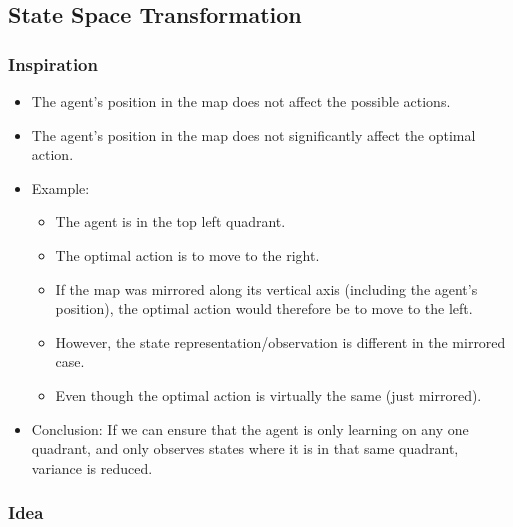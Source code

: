\documentclass{article} %
\begin{document}
	\subsection{State Space Transformation}
	\subsubsection{Inspiration}
	\begin{itemize}
		\item The agent's position in the map does not affect the possible actions.
		\item The agent's position in the map does not significantly affect the optimal action.
		\item Example:
		\begin{itemize}
			\item The agent is in the top left quadrant.
			\item The optimal action is to move to the right.
			\item If the map was mirrored along its vertical axis (including the agent's position), the optimal action would therefore be to move to the left.
			\item However, the state representation/observation is different in the mirrored case.
			\item Even though the optimal action is virtually the same (just mirrored).
		\end{itemize}
		\item Conclusion: If we can ensure that the agent is only learning on any one quadrant, and only observes states where it is in that same quadrant, variance is reduced.
	\end{itemize}
	
	\subsubsection{Idea}
	
\end{document}
